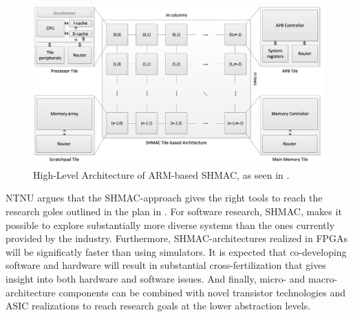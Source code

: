 \begin{figure}[htb]
    \centering
    \includegraphics[width=1.0\textwidth]{Figures/Heterogeneous/SHMAC}
    \caption{High-Level Architecture of ARM-based SHMAC, as seen in \cite{shmac-plan}.}
    \label{fig:shmac}
\end{figure}

NTNU argues that the SHMAC-approach gives the right tools to reach the research goles outlined in the plan in \cite{shmac-plan}.
For software research, SHMAC, makes it possible to explore substantially more diverse systems than the ones currently provided by the industry.
Furthermore, SHMAC-architectures realized in FPGAs will be significatly faster than using simulators.
It is expected that co-developing software and hardware will result in substantial cross-fertilization that gives insight into both hardware and software issues.
And finally, micro- and macro-architecture components can be combined with novel transistor technologies and ASIC realizations to reach research goals at the lower abstraction levels.


